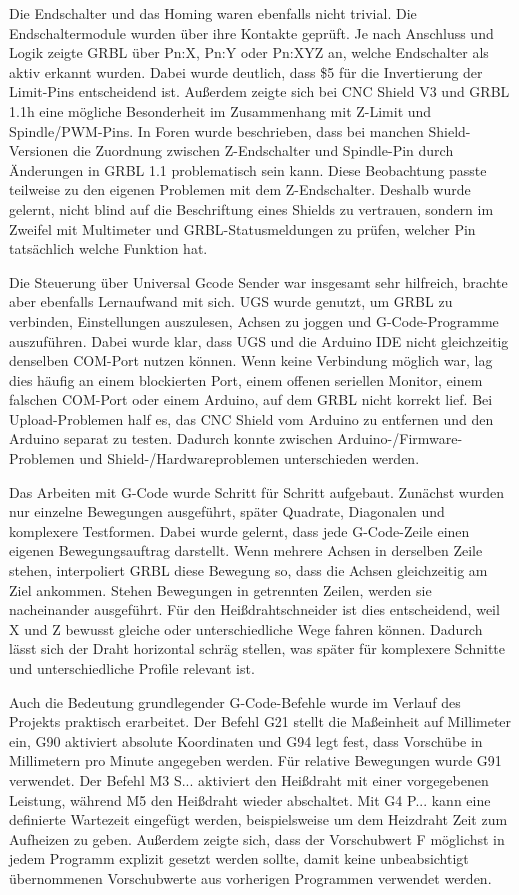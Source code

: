 Die Endschalter und das Homing waren ebenfalls nicht trivial. Die Endschaltermodule wurden über ihre Kontakte geprüft. Je nach Anschluss und Logik zeigte GRBL über Pn:X, Pn:Y oder Pn:XYZ an, welche Endschalter als aktiv erkannt wurden. Dabei wurde deutlich, dass \$5 für die Invertierung der Limit-Pins entscheidend ist. Außerdem zeigte sich bei CNC Shield V3 und GRBL 1.1h eine mögliche Besonderheit im Zusammenhang mit Z-Limit und Spindle/PWM-Pins. In Foren wurde beschrieben, dass bei manchen Shield-Versionen die Zuordnung zwischen Z-Endschalter und Spindle-Pin durch Änderungen in GRBL 1.1 problematisch sein kann. Diese Beobachtung passte teilweise zu den eigenen Problemen mit dem Z-Endschalter. Deshalb wurde gelernt, nicht blind auf die Beschriftung eines Shields zu vertrauen, sondern im Zweifel mit Multimeter und GRBL-Statusmeldungen zu prüfen, welcher Pin tatsächlich welche Funktion hat.

Die Steuerung über Universal Gcode Sender war insgesamt sehr hilfreich, brachte aber ebenfalls Lernaufwand mit sich. UGS wurde genutzt, um GRBL zu verbinden, Einstellungen auszulesen, Achsen zu joggen und G-Code-Programme auszuführen. Dabei wurde klar, dass UGS und die Arduino IDE nicht gleichzeitig denselben COM-Port nutzen können. Wenn keine Verbindung möglich war, lag dies häufig an einem blockierten Port, einem offenen seriellen Monitor, einem falschen COM-Port oder einem Arduino, auf dem GRBL nicht korrekt lief. Bei Upload-Problemen half es, das CNC Shield vom Arduino zu entfernen und den Arduino separat zu testen. Dadurch konnte zwischen Arduino-/Firmware-Problemen und Shield-/Hardwareproblemen unterschieden werden.

Das Arbeiten mit G-Code wurde Schritt für Schritt aufgebaut. Zunächst wurden nur einzelne Bewegungen ausgeführt, später Quadrate, Diagonalen und komplexere Testformen. Dabei wurde gelernt, dass jede G-Code-Zeile einen eigenen Bewegungsauftrag darstellt. Wenn mehrere Achsen in derselben Zeile stehen, interpoliert GRBL diese Bewegung so, dass die Achsen gleichzeitig am Ziel ankommen. Stehen Bewegungen in getrennten Zeilen, werden sie nacheinander ausgeführt. Für den Heißdrahtschneider ist dies entscheidend, weil X und Z bewusst gleiche oder unterschiedliche Wege fahren können. Dadurch lässt sich der Draht horizontal schräg stellen, was später für komplexere Schnitte und unterschiedliche Profile relevant ist.

Auch die Bedeutung grundlegender G-Code-Befehle wurde im Verlauf des Projekts praktisch erarbeitet. Der Befehl G21 stellt die Maßeinheit auf Millimeter ein, G90 aktiviert absolute Koordinaten und G94 legt fest, dass Vorschübe in Millimetern pro Minute angegeben werden. Für relative Bewegungen wurde G91 verwendet. Der Befehl M3 S... aktiviert den Heißdraht mit einer vorgegebenen Leistung, während M5 den Heißdraht wieder abschaltet. Mit G4 P... kann eine definierte Wartezeit eingefügt werden, beispielsweise um dem Heizdraht Zeit zum Aufheizen zu geben. Außerdem zeigte sich, dass der Vorschubwert F möglichst in jedem Programm explizit gesetzt werden sollte, damit keine unbeabsichtigt übernommenen Vorschubwerte aus vorherigen Programmen verwendet werden.

